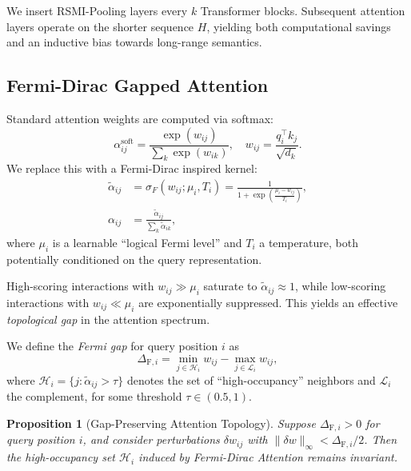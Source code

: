 \documentclass{article}
\newtheorem{proposition}{Proposition}
\newcommand{\fermigap}[1]{\Delta_{\text{F},#1}}
\begin{document}
We insert RSMI-Pooling layers every $k$ Transformer blocks. Subsequent attention layers operate on the shorter sequence $H$, yielding both computational savings and an inductive bias towards long-range semantics.

\subsection{Fermi-Dirac Gapped Attention}

Standard attention weights are computed via softmax:
\begin{equation}
    \alpha_{ij}^{\text{soft}} =
    \frac{\exp(w_{ij})}{\sum_{k} \exp(w_{ik})},
    \quad
    w_{ij} = \frac{q_i^\top k_j}{\sqrt{d_k}}.
\end{equation}
We replace this with a Fermi-Dirac inspired kernel:
\begin{align}
    \tilde{\alpha}_{ij} 
    &= \sigma_F(w_{ij}; \mu_i, T_i)
    = \frac{1}{1 + \exp\!\left(\frac{\mu_i - w_{ij}}{T_i}\right)}, \label{eq:fermi-kernel} \\
    \alpha_{ij} 
    &= \frac{\tilde{\alpha}_{ij}}{\sum_{k} \tilde{\alpha}_{ik}},
\end{align}
where $\mu_i$ is a learnable ``logical Fermi level'' and $T_i$ a temperature, both potentially conditioned on the query representation.

High-scoring interactions with $w_{ij} \gg \mu_i$ saturate to $\tilde{\alpha}_{ij} \approx 1$, while low-scoring interactions with $w_{ij} \ll \mu_i$ are exponentially suppressed. This yields an effective \emph{topological gap} in the attention spectrum.

We define the \emph{Fermi gap} for query position $i$ as
\begin{equation}
    \fermigap{i} =
    \min_{j \in \mathcal{H}_i} w_{ij} -
    \max_{j \in \mathcal{L}_i} w_{ij},
\end{equation}
where $\mathcal{H}_i = \{j : \tilde{\alpha}_{ij} > \tau\}$ denotes the set of ``high-occupancy'' neighbors and $\mathcal{L}_i$ the complement, for some threshold $\tau \in (0.5,1)$.

\begin{proposition}[Gap-Preserving Attention Topology]
\label{prop:gap}
Suppose $\fermigap{i} > 0$ for query position $i$, and consider perturbations $\delta w_{ij}$ with $\|\delta w\|_\infty < \fermigap{i} / 2$. Then the high-occupancy set $\mathcal{H}_i$ induced by Fermi-Dirac Attention remains invariant.
\end{proposition}
\end{document}
